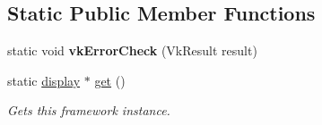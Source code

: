 \subsection*{Static Public Member Functions}
\begin{DoxyCompactItemize}
\item 
\mbox{\label{classflounder_1_1display_a8b040aa261e4c94a9cb55bd7d3c133b1}} 
static void {\bfseries vk\+Error\+Check} (Vk\+Result result)
\item 
static \hyperlink{classflounder_1_1display}{display} $\ast$ \hyperlink{classflounder_1_1display_a7c7015939f48bf4526bb0330ea4fcd2f}{get} ()
\begin{DoxyCompactList}\small\item\em Gets this framework instance. \end{DoxyCompactList}\end{DoxyCompactItemize}
